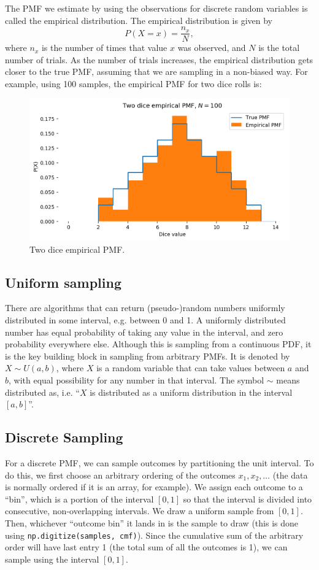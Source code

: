 \documentclass[a4paper, openany]{memoir}
\begin{document}
The PMF we estimate by using the observations for discrete random variables is called the empirical distribution. The empirical distribution is given by
\[P(X = x) = \frac{n_x}{N},\]
where $n_x$ is the number of times that value $x$ was observed, and $N$ is the total number of trials. As the number of trials increases, the empirical distribution gets closer to the true PMF, assuming that we are sampling in a non-biased way. For example, using 100 samples, the empirical PMF for two dice rolls is:
\begin{figure}[H]
    \centering
    \includegraphics[scale=0.6]{src/5.2 two dice empirical pmf.png}
    \caption{Two dice empirical PMF.}
\end{figure}

\subsection{Uniform sampling}
There are algorithms that can return (pseudo-)random numbers uniformly distributed in some interval, e.g. between 0 and 1. A uniformly distributed number has equal probability of taking any value in the interval, and zero probability everywhere else. Although this is sampling from a continuous PDF, it is the key building block in sampling from arbitrary PMFs. It is denoted by $X \sim U(a, b)$, where $X$ is a random variable that can take values between $a$ and $b$, with equal possibility for any number in that interval. The symbol $\sim$ means distributed as, i.e. ``$X$ is distributed as a uniform distribution in the interval $[a, b]$''.

\subsection{Discrete Sampling}
For a discrete PMF, we can sample outcomes by partitioning the unit interval. To do this, we first choose an arbitrary ordering of the outcomes $x_1, x_2, \dots$ (the data is normally ordered if it is an array, for example). We assign each outcome to a ``bin'', which is a portion of the interval $[0, 1]$ so that the interval is divided into consecutive, non-overlapping intervals. We draw a uniform sample from $[0, 1]$. Then, whichever ``outcome bin'' it lands in is the sample to draw (this is done using \texttt{np.digitize(samples, cmf)}). Since the cumulative sum of the arbitrary order will have last entry 1 (the total sum of all the outcomes is 1), we can sample using the interval $[0, 1]$.
\end{document}

